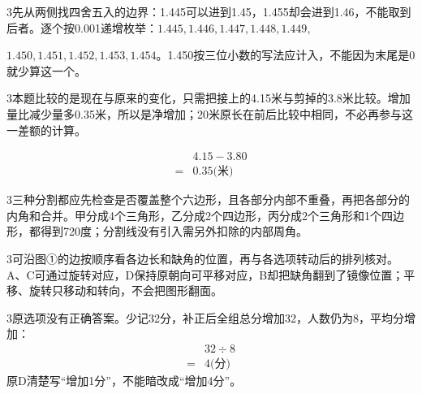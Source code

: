 \documentclass[multi=snippet,border={5bp 20bp 5bp 5bp}]{standalone}
\newenvironment{snippet}[3]{\begin{minipage}{#1bp}\color{answerred}\fontsize{#2}{#3}\selectfont\raggedright}{\end{minipage}}
\begin{document}
\begin{snippet}{505}{11.5}{14}\begin{multicols}{3}\raggedcolumns 先从两侧找四舍五入的边界：1.445可以进到1.45，1.455却会进到1.46，不能取到后者。逐个按0.001递增枚举：\(1.445,\allowbreak 1.446,\allowbreak 1.447,\allowbreak 1.448,\allowbreak 1.449,\allowbreak \)\allowbreak \par \(1.450,\allowbreak 1.451,\allowbreak 1.452,\allowbreak 1.453,\allowbreak 1.454\)\allowbreak 。1.450按三位小数的写法应计入，不能因为末尾是0就少算这一个。\end{multicols}\end{snippet}
\begin{snippet}{505}{11.5}{14}\begin{multicols}{3}\raggedcolumns 本题比较的是现在与原来的变化，只需把接上的4.15米与剪掉的3.8米比较。增加量比减少量多0.35米，所以是净增加；20米原长在前后比较中相同，不必再参与这一差额的计算。\par \[\begin{aligned}&4.15-3.80\\={}&0.35\text{(米)}\end{aligned}\]\end{multicols}\end{snippet}
\begin{snippet}{505}{11.5}{14}\begin{multicols}{3}\raggedcolumns 三种分割都应先检查是否覆盖整个六边形，且各部分内部不重叠，再把各部分的内角和合并。甲分成4个三角形，乙分成2个四边形，丙分成2个三角形和1个四边形，都得到720度；分割线没有引入需另外扣除的内部周角。\end{multicols}\end{snippet}
\begin{snippet}{505}{11.5}{14}\begin{multicols}{3}\raggedcolumns 可沿图①的边按顺序看各边长和缺角的位置，再与各选项转动后的排列核对。A、C可通过旋转对应，D保持原朝向可平移对应，B却把缺角翻到了镜像位置；平移、旋转只移动和转向，不会把图形翻面。\end{multicols}\end{snippet}
\begin{snippet}{505}{11.5}{14}\begin{multicols}{3}\raggedcolumns 原选项没有正确答案。少记32分，补正后全组总分增加32，人数仍为8，平均分增加：\[\begin{aligned}&32\div8\\={}&4\text{(分)}\end{aligned}\]原D清楚写“增加1分”，不能暗改成“增加4分”。\end{multicols}\end{snippet}
\end{document}
